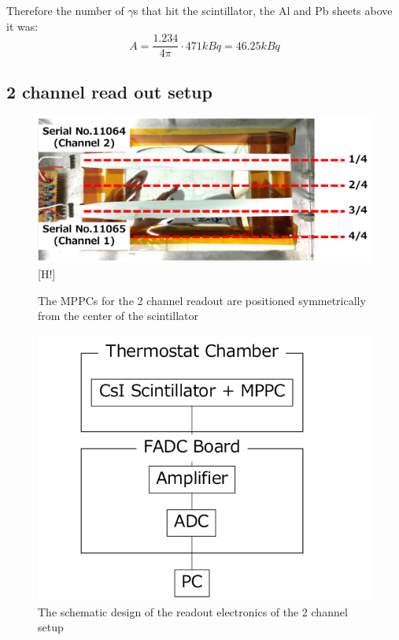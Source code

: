 \documentclass[12pt, a4paper,titlepage]{article}
\numberwithin{equation}{section}
\numberwithin{figure}{section}
\begin{document}
 Therefore the number of $\gamma$s that hit the scintillator, the Al and Pb sheets above it was:
$$A = \frac{1.234}{4 \pi} \cdot 471 kBq = 46.25 kBq$$

\pagebreak

\subsection{2 channel read out setup}

\begin{figure}[h!]
\centering
\includegraphics[width=130.0mm]{images/2channelsetup.png}[H!]
\caption{The MPPCs for the 2 channel readout are positioned symmetrically from the center of the scintillator}
\label{fig:schem}
\end{figure}

\begin{figure}[h!]
\centering
\includegraphics[width=130.0mm]{images/2channelelectronics.png}
\caption{The schematic design of the readout electronics of the 2 channel setup}
\end{figure}
\end{document}
